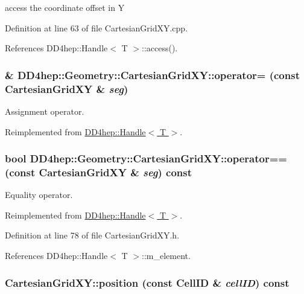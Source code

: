 access the coordinate offset in Y 

Definition at line 63 of file CartesianGridXY.cpp.

References DD4hep::Handle$<$ T $>$::access().\hypertarget{class_d_d4hep_1_1_geometry_1_1_cartesian_grid_x_y_aa93e75d1fc33ccb737f0eb345aa3581a}{
\subsubsection[{operator=}]{\& DD4hep::Geometry::CartesianGridXY::operator= (const {\bf CartesianGridXY} \& {\em seg})}}
\label{class_d_d4hep_1_1_geometry_1_1_cartesian_grid_x_y_aa93e75d1fc33ccb737f0eb345aa3581a}


Assignment operator. 

Reimplemented from \hyperlink{class_d_d4hep_1_1_handle_a9bbf8f498df42e81ad26fb00233505a6}{DD4hep::Handle$<$ T $>$}.\hypertarget{class_d_d4hep_1_1_geometry_1_1_cartesian_grid_x_y_af5cf0fdf544e007c8ed2eba569e1f61c}{
\subsubsection[{operator==}]{\setlength{\rightskip}{0pt plus 5cm}bool DD4hep::Geometry::CartesianGridXY::operator== (const {\bf CartesianGridXY} \& {\em seg}) const}}
\label{class_d_d4hep_1_1_geometry_1_1_cartesian_grid_x_y_af5cf0fdf544e007c8ed2eba569e1f61c}


Equality operator. 

Reimplemented from \hyperlink{class_d_d4hep_1_1_handle_a618470283b3a2cc5ed0545fec90dc759}{DD4hep::Handle$<$ T $>$}.

Definition at line 78 of file CartesianGridXY.h.

References DD4hep::Handle$<$ T $>$::m\_\-element.\hypertarget{class_d_d4hep_1_1_geometry_1_1_cartesian_grid_x_y_aeac0022c94fc5d1d678e2189bde347eb}{
\subsubsection[{position}]{ CartesianGridXY::position (const CellID \& {\em cellID}) const}}
\label{class_d_d4hep_1_1_geometry_1_1_cartesian_grid_x_y_aeac0022c94fc5d1d678e2189bde347eb}



